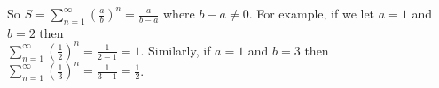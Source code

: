 \documentclass[11pt, oneside]{article}   	%
\begin{document}
\bigskip
\noindent
So $S = \sum\limits_{n = 1}^\infty (\frac{a}{b})^n  =  \frac{a}{b -a}$ where $b - a \neq 0$. For example, if we  let $a =1$ and $b =2$ then \\
$\sum\limits_{n = 1}^\infty (\frac{1}{2})^n  =  \frac{1}{2-1} = 1$. Similarly, if $a =1$ and $b = 3$ then 
$\sum\limits_{n = 1}^\infty (\frac{1}{3})^n  =  \frac{1}{3-1} = \frac{1}{2}$. 
\end{document}
